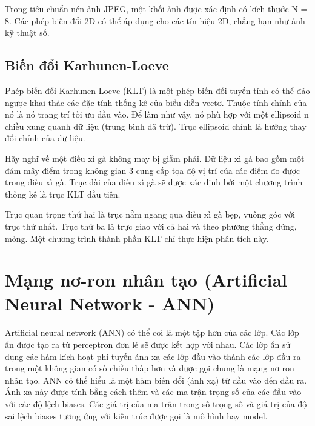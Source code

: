 Trong tiêu chuẩn nén ảnh JPEG, một khối ảnh được xác định có kích thước N = 8.
Các phép biến đổi 2D có thể áp dụng cho các tín hiệu 2D, chẳng hạn như ảnh kỹ
thuật số.



\subsection{Biến đổi Karhunen-Loeve}

Phép biến đổi Karhunen-Loeve (KLT) là một phép biến đổi tuyến tính
có thể đảo ngược khai thác các đặc tính thống kê của biểu diễn vectơ.
Thuộc tính chính của nó là nó trang trí tối ưu đầu vào. Để làm như vậy,
nó phù hợp với một ellipsoid n chiều xung quanh dữ liệu (trung bình đã trừ).
Trục ellipsoid chính là hướng thay đổi chính của dữ liệu.

Hãy nghĩ về một điếu xì gà không may bị giẫm phải. Dữ liệu xì
gà bao gồm một đám mây điểm trong không gian 3 cung cấp tọa độ vị trí của các điểm đo được trong điếu xì gà. Trục dài của điếu xì gà sẽ được xác định bởi một chương trình thống kê là trục KLT đầu tiên.

Trục quan trọng thứ hai là trục nằm ngang qua điếu xì gà bẹp,
vuông góc với trục thứ nhất. Trục thứ ba là trực giao với cả hai
và theo phương thẳng đứng, mỏng. Một chương trình thành phần KLT chỉ
thực hiện phân tích này.

\newpage
\section{Mạng nơ-ron nhân tạo (Artificial Neural Network - ANN)}

Artificial neural network (ANN) có thể coi là một tập hơn của các lớp.
Các lớp ẩn được tạo ra từ perceptron đơn lẻ sẽ được kết hợp với nhau.
Các lớp ẩn sử dụng các hàm kích hoạt phi tuyến ánh xạ các lớp đầu vào
thành các lớp đầu ra trong một không gian có số chiều thấp hơn và được
gọi chung là mạng nơ ron nhân tạo. ANN có thể hiểu là một hàm biến đổi
(ánh xạ) từ đầu vào đến đầu ra. Ánh xạ này được tính bằng cách thêm và
các ma trận trọng số của các đầu vào với các độ lệch biases. Các giá
trị của ma trận trong số trọng số và giá trị của độ sai lệch biases
tương ứng với kiến trúc được gọi là mô hình hay model.

